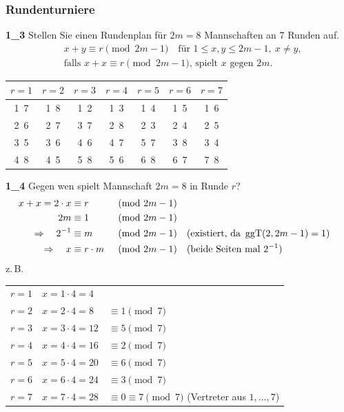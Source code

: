 \subsubsection*{Rundenturniere}

\begin{loesung}
\textbf{1\_3} Stellen Sie einen Rundenplan für $2m = 8$ Mannschaften an 7 Runden auf.
\begin{align*}
& x + y \equiv r \pmod{2m-1} \quad \text{für } 1 \le x, y \le 2m-1,\ x \neq y,\\
& \text{falls } x + x \equiv r \pmod{2m-1}\text{, spielt } x \text{ gegen } 2m.
\end{align*}
\begin{center}
\begin{tabular}{ccccccc}
\toprule
$r=1$ & $r=2$ & $r=3$ & $r=4$ & $r=5$ & $r=6$ & $r=7$\\
\midrule
1\ 7 & 1\ 8 & 1\ 2 & 1\ 3 & 1\ 4 & 1\ 5 & 1\ 6\\
2\ 6 & 2\ 7 & 3\ 7 & 2\ 8 & 2\ 3 & 2\ 4 & 2\ 5\\
3\ 5 & 3\ 6 & 4\ 6 & 4\ 7 & 5\ 7 & 3\ 8 & 3\ 4\\
4\ 8 & 4\ 5 & 5\ 8 & 5\ 6 & 6\ 8 & 6\ 7 & 7\ 8\\
\bottomrule
\end{tabular}
\end{center}
\end{loesung}

\begin{loesung}
\textbf{1\_4} Gegen wen spielt Mannschaft $2m = 8$ in Runde $r$?
\begin{align*}
x + x = 2 \cdot x &\equiv r && \pmod{2m-1}\\
2m &\equiv 1 && \pmod{2m-1}\\
\Rightarrow\quad 2^{-1} &\equiv m && \pmod{2m-1} && \text{(existiert, da } \operatorname{ggT}(2, 2m-1) = 1\text{)}\\
\Rightarrow\quad x &\equiv r \cdot m && \pmod{2m-1} && \text{(beide Seiten mal } 2^{-1}\text{)}
\end{align*}
z.\,B.
\begin{center}
\begin{tabular}{lll}
$r = 1$ & $x = 1 \cdot 4 = 4$ & \\
$r = 2$ & $x = 2 \cdot 4 = 8$ & $\equiv 1 \pmod{7}$\\
$r = 3$ & $x = 3 \cdot 4 = 12$ & $\equiv 5 \pmod{7}$\\
$r = 4$ & $x = 4 \cdot 4 = 16$ & $\equiv 2 \pmod{7}$\\
$r = 5$ & $x = 5 \cdot 4 = 20$ & $\equiv 6 \pmod{7}$\\
$r = 6$ & $x = 6 \cdot 4 = 24$ & $\equiv 3 \pmod{7}$\\
$r = 7$ & $x = 7 \cdot 4 = 28$ & $\equiv 0 \equiv 7 \pmod{7}$ (Vertreter aus $1, \dots, 7$)
\end{tabular}
\end{center}
\end{loesung}

